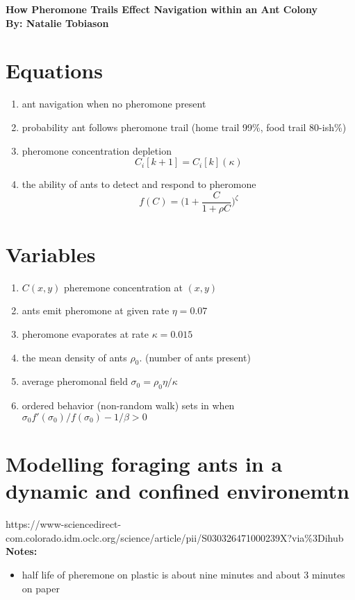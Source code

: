 \documentclass[12pt]{article}
\begin{document}
\begin{center}
\Large\bf How Pheromone Trails Effect Navigation within an Ant Colony\\[1pc]
\large\bf By: Natalie Tobiason
\end{center}

\section{Equations}
\begin{enumerate}
  \item ant navigation when no pheromone present
  \item probability ant follows pheromone trail (home trail 99\%, food trail 80-ish\%)
  \item pheromone concentration depletion $$ C_i[k+1]=C_i[k](\kappa) $$
  \item the ability of ants to detect and respond to pheromone $$ f(C) = \bigg( 1+ \frac{C}{1+\rho C}\bigg)^\zeta$$
\end{enumerate}

\section{Variables}
\begin{enumerate}
  \item $C(x,y)$ pheremone concentration at $(x,y)$
  \item ants emit pheromone at given rate $\eta = 0.07$
  \item pheromone evaporates at rate $\kappa = 0.015$
  \item the mean density of ants $\rho_0$. (number of ants present)
  \item average pheromonal field $\sigma_0 = \rho_0\eta/\kappa$
  \item ordered behavior (non-random walk) sets in when $\sigma_0 f'(\sigma_0)/f(\sigma_0)-1/\beta > 0$
\end{enumerate}

\section{Modelling foraging ants in a dynamic and confined environemtn}
https://www-sciencedirect-com.colorado.idm.oclc.org/science/article/pii/S030326471000239X?via\%3Dihub
\\ \textbf{Notes:}
\begin{itemize}
  \item half life of pheremone on plastic is about nine minutes and about 3 minutes on paper
\end{itemize}
\end{document}
